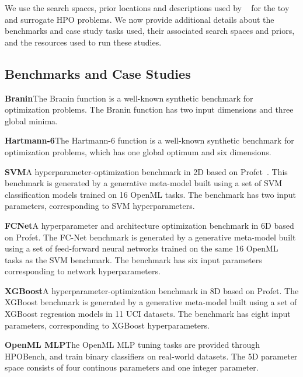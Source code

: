  We use the search spaces, prior locations and descriptions used by ~\citep{souza2021bayesian} for the toy and surrogate HPO problems.
We now provide additional details about the benchmarks and case study tasks used, their associated search spaces and priors, and the resources used to run these studies.

\subsection{Benchmarks and Case Studies}

\textbf{Branin}\quad The Branin function is a well-known synthetic benchmark for optimization problems. The Branin function has two input dimensions and three global minima. %

\textbf{Hartmann-6}\quad The Hartmann-6 function is a well-known synthetic benchmark for optimization problems, which has one global optimum and six dimensions. %

\textbf{SVM}\quad A hyperparameter-optimization benchmark in 2D based on Profet~\citep{profet}. This benchmark is generated by a generative meta-model built using a set of SVM classification models trained on 16 OpenML tasks. The benchmark has two input parameters, corresponding to SVM hyperparameters.

\textbf{FCNet}\quad A hyperparameter and architecture optimization benchmark in 6D based on Profet. The FC-Net benchmark is generated by a generative meta-model built using a set of feed-forward neural networks trained on the same 16 OpenML tasks as the SVM benchmark. The benchmark has six input parameters corresponding to network hyperparameters.

\textbf{XGBoost}\quad A hyperparameter-optimization benchmark in 8D based on Profet. The XGBoost benchmark is generated by a generative meta-model built using a set of XGBoost regression models in 11 UCI datasets. The benchmark has eight input parameters, corresponding to XGBoost hyperparameters.

\textbf{OpenML MLP}\quad The OpenML MLP tuning tasks are provided through HPOBench\cite{eggensperger2021hpobench}, and train binary classifiers on real-world datasets. The 5D parameter space consists of four continous parameters and one integer parameter.

